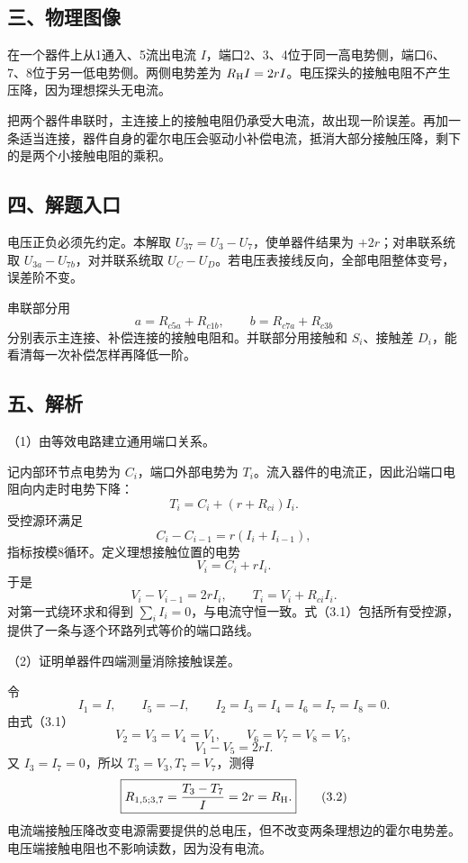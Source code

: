 \documentclass[12pt,a4paper,fontset=fandol]{ctexart}
\begin{document}
\subsection{三、物理图像}\label{ux4e09ux7269ux7406ux56feux50cf-2}

在一个器件上从1通入、5流出电流
\(I\)，端口2、3、4位于同一高电势侧，端口6、7、8位于另一低电势侧。两侧电势差为
\(R_{\rm H}I=2rI\)。电压探头的接触电阻不产生压降，因为理想探头无电流。

把两个器件串联时，主连接上的接触电阻仍承受大电流，故出现一阶误差。再加一条适当连接，器件自身的霍尔电压会驱动小补偿电流，抵消大部分接触压降，剩下的是两个小接触电阻的乘积。

\subsection{四、解题入口}\label{ux56dbux89e3ux9898ux5165ux53e3-2}

电压正负必须先约定。本解取 \(U_{37}=U_3-U_7\)，使单器件结果为
\(+2r\)；对串联系统取 \(U_{3a}-U_{7b}\)，对并联系统取
\(U_C-U_D\)。若电压表接线反向，全部电阻整体变号，误差阶不变。

串联部分用 \[
a=R_{c5a}+R_{c1b},\qquad
b=R_{c7a}+R_{c3b}
\] 分别表示主连接、补偿连接的接触电阻和。并联部分用接触和
\(S_i\)、接触差 \(D_i\)，能看清每一次补偿怎样再降低一阶。

\subsection{五、解析}\label{ux4e94ux89e3ux6790-2}

（1）由等效电路建立通用端口关系。

记内部环节点电势为 \(C_i\)，端口外部电势为
\(T_i\)。流入器件的电流正，因此沿端口电阻向内走时电势下降： \[
T_i=C_i+(r+R_{ci})I_i.
\] 受控源环满足 \[
C_i-C_{i-1}=r(I_i+I_{i-1}),
\] 指标按模8循环。定义理想接触位置的电势 \[
V_i=C_i+rI_i.
\] 于是 \[
V_i-V_{i-1}=2rI_i,\qquad
T_i=V_i+R_{ci}I_i.\tag{3.1}
\] 对第一式绕环求和得到
\(\sum_iI_i=0\)，与电流守恒一致。式（3.1）包括所有受控源，提供了一条与逐个环路列式等价的端口路线。

（2）证明单器件四端测量消除接触误差。

令 \[
I_1=I,\qquad I_5=-I,\qquad
I_2=I_3=I_4=I_6=I_7=I_8=0.
\] 由式（3.1） \[
V_2=V_3=V_4=V_1,\qquad
V_6=V_7=V_8=V_5,
\] \[
V_1-V_5=2rI.
\] 又 \(I_3=I_7=0\)，所以 \(T_3=V_3,T_7=V_7\)，测得 \[
\boxed{R_{1,5;3,7}=\frac{T_3-T_7}{I}=2r=R_{\rm H}.}\tag{3.2}
\]
电流端接触压降改变电源需要提供的总电压，但不改变两条理想边的霍尔电势差。电压端接触电阻也不影响读数，因为没有电流。
\end{document}
